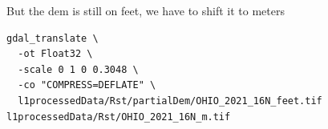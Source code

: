\documentclass[11pt, a4paper]{article}
\begin{document}
But the dem is still on feet, we have to shift it to meters

\begin{lstlisting}[style=bashdark, title={Linux Terminal Session}]
gdal_translate \
  -ot Float32 \
  -scale 0 1 0 0.3048 \
  -co "COMPRESS=DEFLATE" \
  l1processedData/Rst/partialDem/OHIO_2021_16N_feet.tif l1processedData/Rst/OHIO_2021_16N_m.tif
\end{lstlisting}


\end{document}
